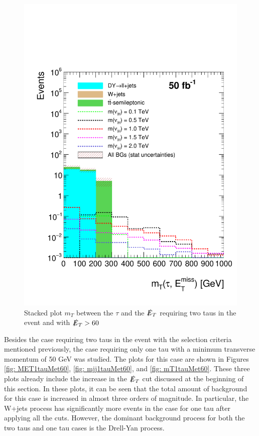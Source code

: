 \begin{figure}[htbp!]
\centering
\includegraphics[width=0.9\linewidth]{StackPlots/mT_2Tau_met60_50ifb_2moreSignals.pdf}
\caption{Stacked plot $m_{T}$ between the $\tau$ and the $\slashed{E}_{T}$ requiring two taus in the event and with $\slashed{E}_{T} > 60$}
\label{fig: mT2tausMet60}
\end{figure}


Besides the case requiring two taus in the event with the selection criteria mentioned previously, the case requiring only one tau with a minimum transverse momentum of 50 GeV was studied. The plots for this case are shown in Figures \ref{fig: MET1tauMet60}, \ref{fig: mjj1tauMet60}, and \ref{fig: mT1tauMet60}. These three plots already include the increase in the $\slashed{E}_{T}$ cut discussed at the beginning of this section. In these plots, it can be seen that the total amount of background for this case is increased in almost three orders of magnitude. In particular, the W+jets process has significantly more events in the case for one tau after applying all the cuts. However, the dominant background process for both the two taus and one tau cases is the Drell-Yan process.

